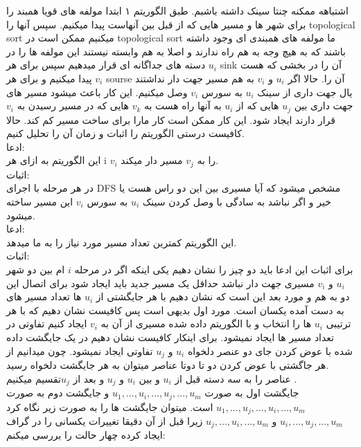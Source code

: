 \problem{}
اشتباهه ممکنه چنتا سینک داشته باشبم.
 طبق الگوریتم ۱ ابتدا مولفه های قویا همبند را برای شهر ها و مسیر هایی که از قبل بین آنهاست
 پیدا میکنیم.
 سپس آنها را topological sort میکنیم
 ممکن است در topological sort ما مولفه های همبندی ای وجود داشته باشند
 که به هیچ وجه به هم راه ندارند و اصلا به هم وابسته نیستند
 این مولفه ها را در دسته های جداگانه ای قرار میدهیم
 سپس برای هر $u_i$ sink آن را در بخشی که هست پیدا میکنیم
 و برای هر $v_i$ sourse آن را.
 حالا اگر $u_i$ و $v_i$ به هم مسیر جهت دار نداشتند 
 یال جهت داری از سینک $u_i$ به سورس $v_i$ وصل میکنیم.
 این کار باعث میشود مسیر های جهت داری بین $u_j$ هایی که از $u_i$ به 
 آنها راه هست به $v_k$ هایی که در مسیر رسیدن به $v_i$ قرار دارند
 ایجاد شود. 
 این کار ممکن است کار مارا برای ساخت مسیر کم کند.
 حالا کافیست درستی الگوریتم را اثبات و زمان آن را تحلیل کنیم.\\
 ادعا:\\
 این الگوریتم به ازای هر i $v_i$ را به $v_j$ مسیر دار میکند.\\
 اثبات:\\
 در هر مرحله با اجرای DFS مشخص میشود که آیا مسیری بین این دو راس هست یا خیر 
 و اگر نباشد به سادگی با وصل کردن سینک $u_i$ به 
 سورس $v_i$ این مسیر ساخته میشود.\\
 ادعا:\\
 این الگوریتم کمترین تعداد مسیر مورد نیاز را به ما میدهد.\\
 اثبات:\\
 برای اثبات این ادعا باید دو چیز را نشان دهیم یکی اینکه اگر در مرحله $i$ ام
 بین دو شهر $u_i$ و $v_i$ مسیری جهت دار نباشد
 حداقل یک مسیر جدید باید ایجاد شود برای اتصال این دو به هم
 و مورد بعد این است که نشان دهیم با هر جایگشتی از $u_i$ ها 
 تعداد مسیر های به دست آمده یکسان است.
 مورد اول بدیهی است پس کافیست نشان دهیم که با هر ترتیبی $u_i$ ها را انتخاب
 و با الگوریتم داده شده مسیری از آن به $v_i$ ایجاد کنیم
 تفاوتی در تعداد مسیر ها ایجاد نمیشود.
 برای اینکار کافیست نشان دهیم در یک جایگشت داده شده با عوض کردن جای دو عنصر
 دلخواه $u_i$ و $u_j$ تفاوتی ایجاد نمیشود.
 چون میدانیم از هر جاگشتی با عوض کردن دو تا دوتا عناصر میتوان به 
 هر جایگشت دلخواه رسید.
 \\
 عناصر را به سه دسته قبل از 
 $u_i$ و بین $u_i$ و $u_j$
 و بعد از $u_j$تقسیم میکنیم
 .\\
 جایگشت اول به صورت 
 $u_1,...,u_i,...,u_j,...,u_m$ و جایگشت دوم به صورت
 $u_1,...,u_j,...,u_i,...,u_m$ است.
 میتوان جایگشت ها را به صورت زیر نگاه کرد
 $u_i,...,u_j,...,u_m$ و
 $u_j,...,u_i,...,u_m$
 زیرا قبل از آن دقیقا تغییرات یکسانی را در گراف ایجاد کرده
 چهار حالت را بررسی میکنم:\\

